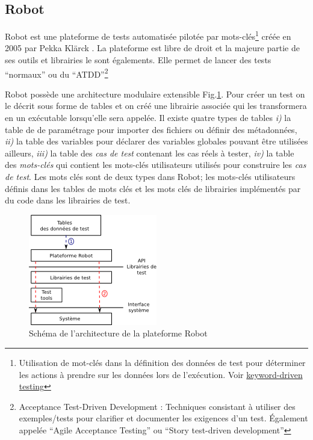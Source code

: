 \subsection{Robot}

Robot \citep{ROBOT_web} est une plateforme de tests automatisée pilotée par mots-clés\footnote{Utilisation de mot-clés dans la définition des données de test pour déterminer les actions à prendre sur les données lors de l'exécution. Voir \href{https://en.wikipedia.org/wiki/Keyword-driven\_testing}{keyword-driven testing}} créée en 2005 par Pekka Klärck \citep{ROBOTlaukkanen2006data}. La plateforme est libre de droit et la majeure partie de ses outils et librairies le sont égalements. Elle permet de lancer des tests ``normaux'' ou du ``ATDD''\footnote{Acceptance Test-Driven Development \citep{ROBOTlarman2010practices}: Techniques consistant à utiliser des exemples/tests pour clarifier et documenter les exigences d'un test. Également appelée ``Agile Acceptance Testing'' ou ``Story test-driven development''}

Robot possède une architecture modulaire extensible
Fig.\ref{Robot_arch}.  Pour créer un test on le décrit sous forme de
tables et on créé une librairie associée qui les transformera en un
exécutable lorsqu'elle sera appelée. Il existe quatre types de tables
\textit{i)} la table de de paramétrage pour importer des fichiers ou
définir des métadonnées, \textit{ii)} la table des variables pour
déclarer des variables globales pouvant être utilisées ailleurs,
\textit{iii)} la table des \textit{cas de test} contenant les cas
réels à tester, \textit{iv)} la table des \textit{mots-clés} qui
contient les mots-clés utilisateurs utilisés pour construire les
\textit{cas de test}.  Les mots clés sont de deux types dans Robot;
les mots-clés utilisateurs définis dans les tables de mots clés et les
mots clés de librairies implémentés par du code dans les librairies de
test.

\begin{figure}[H]
  \centering
  \includegraphics{Pictures/png/Robot_architecture}
  \caption{Schéma de l'architecture de la plateforme Robot}
  \label{Robot_arch}
\end{figure}

